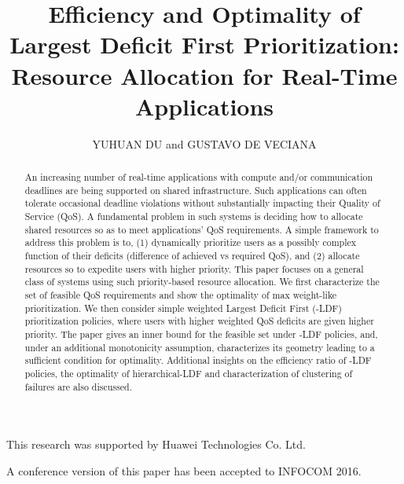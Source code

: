 \documentclass[prodmode,acmtompecs]{acmsmall}
\newcommand{\add}[1]{#1}
\begin{document}

\title{Efficiency and Optimality of Largest Deficit First Prioritization: Resource Allocation for Real-Time Applications}
\author{YUHUAN DU and GUSTAVO DE VECIANA
}

\begin{abstract}
An increasing number of real-time applications with compute and/or communication deadlines
are being supported on shared infrastructure.  Such applications can often tolerate 
occasional deadline violations without substantially impacting their Quality of Service (QoS).
A fundamental problem in such systems is deciding how
to allocate shared resources so as to meet applications' QoS requirements.
A simple framework to address this problem is to, (1) dynamically prioritize users as a possibly complex function of their deficits (difference of achieved vs required QoS), and (2) allocate resources so to expedite users with higher priority.
This paper focuses on a general class of systems using such priority-based resource allocation.
We first characterize the set of feasible QoS requirements and show the optimality of max weight-like prioritization.
We then consider simple weighted Largest Deficit First (-LDF)
prioritization policies, where users with higher weighted QoS deficits are given higher priority.
The paper gives an inner bound for the feasible set under -LDF policies, and,
under an additional monotonicity assumption, characterizes its geometry leading to a sufficient condition for optimality.
Additional insights on the efficiency ratio of -LDF policies, the 
optimality of hierarchical-LDF and characterization of clustering of failures are also discussed.
\end{abstract}


\begin{bottomstuff}
\add{
This research was supported by Huawei Technologies Co. Ltd.}

\add{A conference version of this paper has been accepted to INFOCOM 2016. 
}
\end{bottomstuff}

\maketitle
\end{document}

